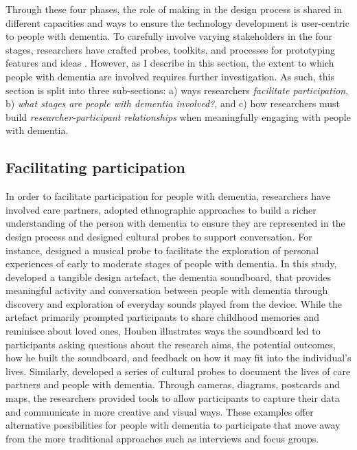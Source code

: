 Through these four phases, the role of making in the design process is shared in different capacities and ways to ensure the technology development is user-centric to people with dementia. To carefully involve varying stakeholders in the four stages, researchers have crafted probes, toolkits, and processes for prototyping features and ideas \citep{sanders2014probes}. However, as I describe in this section, the extent to which people with dementia are involved requires further investigation. As such, this section is split into three sub-sections: a) ways researchers \textit{facilitate participation}, b) \textit{what stages are people with dementia involved?}, and c) how researchers must build \textit{researcher-participant relationships} when meaningfully engaging with people with dementia.

\subsection{Facilitating participation}
\label{BL:SupportParticipation}
In order to facilitate participation for people with dementia, researchers have involved care partners, adopted ethnographic approaches to build a richer understanding of the person with dementia to ensure they are represented in the design process and designed cultural probes to support conversation. For instance, \cite{houben_foregrounding_2019} designed a musical probe to facilitate the exploration of personal experiences of early to moderate stages of people with dementia. In this study, \citeauthor{houben_foregrounding_2019} developed a tangible design artefact, the dementia soundboard, that provides meaningful activity and conversation between people with dementia through discovery and exploration of everyday sounds played from the device. While the artefact primarily prompted participants to share childhood memories and reminisce about loved ones, Houben illustrates ways the soundboard led to participants asking questions about the research aims, the potential outcomes, how he built the soundboard, and feedback on how it may fit into the individual's lives. Similarly, \cite{brown2014using} developed a series of cultural probes to document the lives of care partners and people with dementia. Through cameras, diagrams, postcards and maps, the researchers provided tools to allow participants to capture their data and communicate in more creative and visual ways. These examples offer alternative possibilities for people with dementia to participate that move away from the more traditional approaches such as interviews and focus groups.


